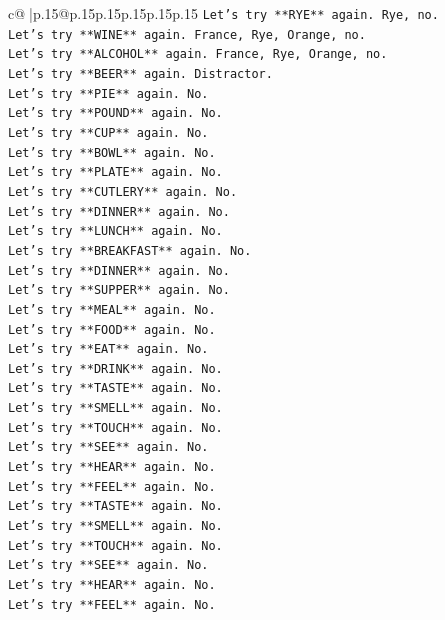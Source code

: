 \documentclass{article}
\begin{document}
{\begin{supertabular}{c@{$\;$}|p{.15\linewidth}@{}p{.15\linewidth}p{.15\linewidth}p{.15\linewidth}p{.15\linewidth}p{.15\linewidth}}
{{{\texttt{Let's try **RYE** again. Rye, no.} \\
\texttt{Let's try **WINE** again. France, Rye, Orange, no.} \\
\texttt{Let's try **ALCOHOL** again. France, Rye, Orange, no.} \\
\texttt{Let's try **BEER** again. Distractor.} \\
\texttt{Let's try **PIE** again. No.} \\
\texttt{Let's try **POUND** again. No.} \\
\texttt{Let's try **CUP** again. No.} \\
\texttt{Let's try **BOWL** again. No.} \\
\texttt{Let's try **PLATE** again. No.} \\
\texttt{Let's try **CUTLERY** again. No.} \\
\texttt{Let's try **DINNER** again. No.} \\
\texttt{Let's try **LUNCH** again. No.} \\
\texttt{Let's try **BREAKFAST** again. No.} \\
\texttt{Let's try **DINNER** again. No.} \\
\texttt{Let's try **SUPPER** again. No.} \\
\texttt{Let's try **MEAL** again. No.} \\
\texttt{Let's try **FOOD** again. No.} \\
\texttt{Let's try **EAT** again. No.} \\
\texttt{Let's try **DRINK** again. No.} \\
\texttt{Let's try **TASTE** again. No.} \\
\texttt{Let's try **SMELL** again. No.} \\
\texttt{Let's try **TOUCH** again. No.} \\
\texttt{Let's try **SEE** again. No.} \\
\texttt{Let's try **HEAR** again. No.} \\
\texttt{Let's try **FEEL** again. No.} \\
\texttt{Let's try **TASTE** again. No.} \\
\texttt{Let's try **SMELL** again. No.} \\
\texttt{Let's try **TOUCH** again. No.} \\
\texttt{Let's try **SEE** again. No.} \\
\texttt{Let's try **HEAR** again. No.} \\
\texttt{Let's try **FEEL** again. No.} \\
}}}
\end{supertabular}}
\end{document}
